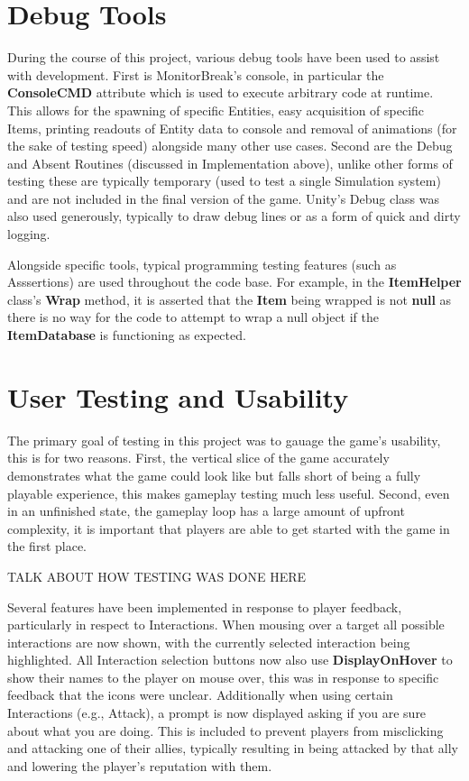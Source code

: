 \documentclass{report}
\begin{document}
\section{Debug Tools}

During the course of this project, various debug tools have been used to assist with development. First is MonitorBreak's console, in particular the \textbf{ConsoleCMD} attribute which is used to execute arbitrary code at runtime. This allows for the spawning of specific Entities, easy acquisition of specific Items, printing readouts of Entity data to console and removal of animations (for the sake of testing speed) alongside many other use cases. Second are the Debug and Absent Routines (discussed in Implementation above), unlike other forms of testing these are typically temporary (used to test a single Simulation system) and are not included in the final version of the game. Unity's Debug class was also used generously, typically to draw debug lines or as a form of quick and dirty logging.

Alongside specific tools, typical programming testing features (such as Asssertions) are used throughout the code base. For example, in the \textbf{ItemHelper} class's \textbf{Wrap} method, it is asserted that the \textbf{Item} being wrapped is not \textbf{null} as there is no way for the code to attempt to wrap a null object if the \textbf{ItemDatabase} is functioning as expected.

\section{User Testing and Usability}

The primary goal of testing in this project was to gauage the game's usability, this is for two reasons. First, the vertical slice of the game accurately demonstrates what the game could look like but falls short of being a fully playable experience, this makes gameplay testing much less useful. Second, even in an unfinished state, the gameplay loop has a large amount of upfront complexity, it is important that players are able to get started with the game in the first place.

TALK ABOUT HOW TESTING WAS DONE HERE

Several features have been implemented in response to player feedback, particularly in respect to Interactions. When mousing over a target all possible interactions are now shown, with the currently selected interaction being highlighted. All Interaction selection buttons now also use \textbf{DisplayOnHover} to show their names to the player on mouse over, this was in response to specific feedback that the icons were unclear. Additionally when using certain Interactions (e.g., Attack), a prompt is now displayed asking if you are sure about what you are doing. This is included to prevent players from misclicking and attacking one of their allies, typically resulting in being attacked by that ally and lowering the player's reputation with them.
\end{document}
